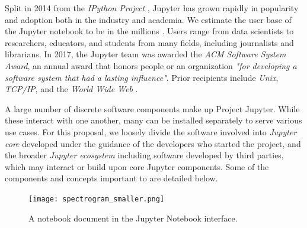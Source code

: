 Split in 2014 from the \emph{IPython Project} \cite{IPython}, Jupyter has grown rapidly in
popularity and adoption both in the industry and academia. We estimate the user
base of the Jupyter notebook to be in the millions \cite{jupyter-grant}. Users range from data
scientists to researchers, educators, and students from many fields,
including journalists and librarians. In 2017, the Jupyter
team was awarded the \emph{ACM Software System Award}, an annual award that
honors people or an organization \emph{"for developing a software system that had a
lasting influence"}. Prior recipients include \emph{Unix}, \emph{TCP/IP}, and
the \emph{World Wide Web} \cite{acm-award}.

A large number of discrete software components make up Project Jupyter.
While these interact with one another, many can be installed separately
to serve various use cases. For this proposal, we loosely divide the
software involved into \emph{Jupyter core} developed under the guidance
of the developers who started the project, and the broader \emph{Jupyter
ecosystem} including software developed by third parties,
which may interact or build upon core Jupyter components.
Some of the components and concepts important to \TheProject are detailed below.

\begin{figure}[ht]\centering
  \centering
  \texttt{[image: spectrogram\_smaller.png]}
  \caption{A notebook document in the Jupyter Notebook interface.}\label{fig:notebook-screenshot}
\end{figure}

